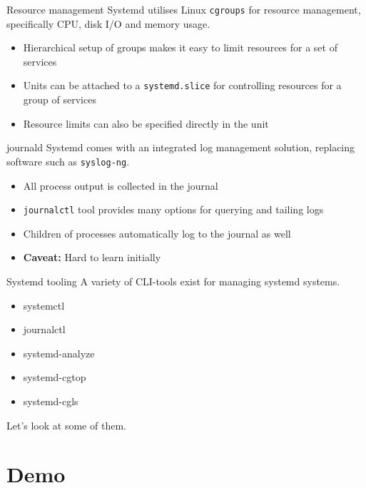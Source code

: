 \documentclass[14pt]{beamer}
\newenvironment{code}{\ttfamily}{\par}
\begin{document}
\begin{frame}{Resource management}
  Systemd utilises Linux \texttt{cgroups} for resource management, specifically CPU, disk I/O and memory usage.

  \begin{itemize}
  \item Hierarchical setup of groups makes it easy to limit resources for a set of services
  \item Units can be attached to a \texttt{systemd.slice} for controlling resources for a group of services
  \item Resource limits can also be specified directly in the unit
  \end{itemize}
\end{frame}

\begin{frame}{journald}
  Systemd comes with an integrated log management solution, replacing software such as \texttt{syslog-ng}.
  \begin{itemize}
  \item All process output is collected in the journal
  \item \texttt{journalctl} tool provides many options for querying and tailing logs
  \item Children of processes automatically log to the journal as well
  \item \textbf{Caveat:} Hard to learn initially
  \end{itemize}
\end{frame}

\begin{frame}{Systemd tooling}
  A variety of CLI-tools exist for managing systemd systems.
  \begin{code}
    \begin{itemize}
    \item systemctl
    \item journalctl
    \item systemd-analyze
    \item systemd-cgtop
    \item systemd-cgls
    \end{itemize}
  \end{code}

  Let's look at some of them.
\end{frame}

\section{Demo}
\end{document}
